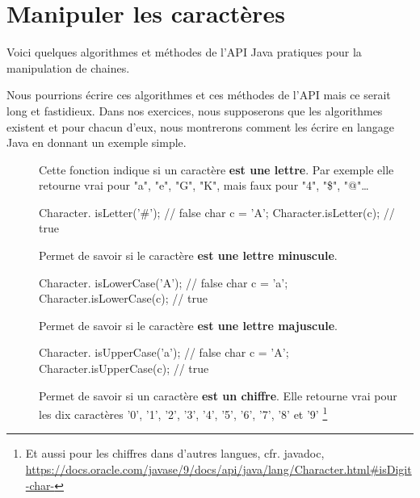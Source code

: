 \section{Manipuler les caractères}

	Voici quelques algorithmes et méthodes de l'API Java  pratiques 
	pour la manipulation de chaines. 

	Nous pourrions écrire ces algorithmes et ces méthodes de l'API mais ce serait
	long et fastidieux. Dans nos exercices, nous supposerons que les algorithmes
	existent et pour chacun d'eux, nous montrerons comment les écrire en langage
	Java en donnant un exemple simple. 
	
	\begin{description}
	
		\item[]
			Cette fonction indique si un caractère \textbf{est une lettre}. 
		Par exemple elle retourne vrai pour "a", "e", "G", "K", 
		mais faux pour "4", "\$", "@"\dots %


		\begin{java}
Character. isLetter('#');  // false
char c = 'A';
Character.isLetter(c);   // true			
		\end{java}
	
	
	\item[]	
		Permet de savoir si le caractère \textbf{est une lettre minuscule}.


		\begin{java}
Character. isLowerCase('A');  // false
char c = 'a';
Character.isLowerCase(c);   // true			
		\end{java}

	\item[]	
		Permet de savoir si le caractère \textbf{est une lettre majuscule}.
		

		\begin{java}
Character. isUpperCase('a');  // false
char c = 'A';
Character.isUpperCase(c);   // true			
		\end{java}
	

	\item[]	
		Permet de savoir si un caractère \textbf{est un chiffre}. 
		Elle retourne vrai pour les dix caractères 
		'0', '1', '2', '3', '4', '5', '6', '7', '8' et '9'%
		\footnote{%
			Et aussi pour les chiffres dans d'autres langues, cfr. javadoc, %
			\url{https://docs.oracle.com/javase/9/docs/api/java/lang/Character.html#isDigit-char-}%
		}


\end{description}
